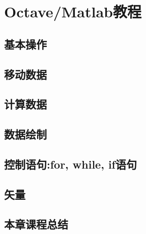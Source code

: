 \chapter{Octave/Matlab教程}

\section{基本操作}

\section{移动数据}

\section{计算数据}

\section{数据绘制}

\section{控制语句:for, while, if语句}

\section{矢量}

\section{本章课程总结}
